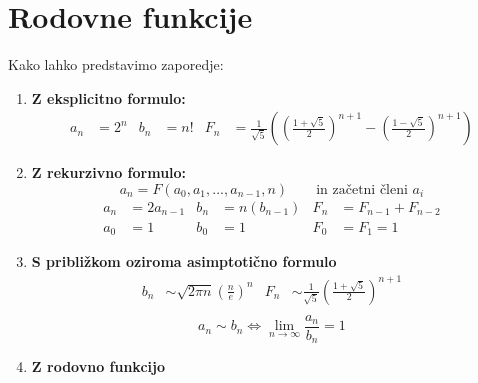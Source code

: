 \documentclass[11pt,a4paper]{article}
\begin{document}
\section*{Rodovne funkcije}
Kako lahko predstavimo zaporedje:
\begin{enumerate}
    \item \textbf{Z eksplicitno formulo:}
    \begin{align*}
        a_n &= 2^n & b_n &= n! & F_n &= \frac{1}{\sqrt{5}} \left( \left( \frac{1+\sqrt{5}}{2} \right)^{n+1} - \left( \frac{1-\sqrt{5}}{2} \right)^{n+1}  \right)
    \end{align*}
    \item \textbf{Z rekurzivno formulo:}
    \[ a_n = F(a_0, a_1, ..., a_{n-1}, n) \qquad \text{in začetni členi } a_i\]
    \begin{align*}
        a_n &= 2a_{n-1} & b_n &= n(b_{n-1}) & F_n &= F_{n-1} + F_{n-2}\\
        a_0 &= 1        &   b_0 &= 1        &   F_0 &= F_1 = 1 
    \end{align*}
    \item \textbf{S približkom oziroma asimptotično formulo}
    \begin{align*}
        b_n &\sim \sqrt{2\pi n} \left( \frac{n}{e} \right)^n & F_n &\sim \frac{1}{\sqrt{5}} \left( \frac{1+\sqrt{5}}{2}\right)^{n+1} \\
    \end{align*}
    \[a_n \sim b_n \Leftrightarrow \lim_{n \to \infty} \frac{a_n}{b_n} = 1\]
    \item \textbf{Z rodovno funkcijo}
    
\end{enumerate}
\end{document}
